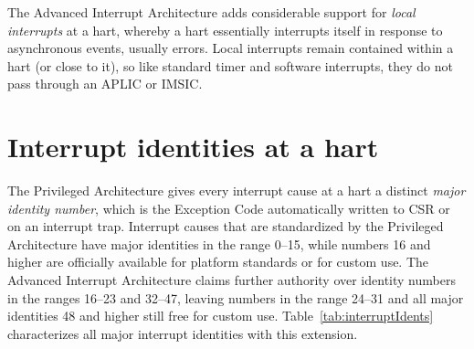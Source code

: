 The Advanced Interrupt Architecture adds considerable support
for \emph{local interrupts} at a hart, whereby a hart essentially
interrupts itself in response to asynchronous events, usually errors.
Local interrupts remain contained within a hart (or close to it),
so like standard {\RISCV} timer and software interrupts, they do not
pass through an APLIC or IMSIC.

\section{Interrupt identities at a hart}

The {\RISCV} Privileged Architecture gives every interrupt cause at a
hart a distinct \emph{major identity number}, which is the Exception
Code automatically written to CSR  or  on an
interrupt trap.
Interrupt causes that are standardized by the Privileged Architecture
have major identities in the range 0--15, while numbers 16 and higher
are officially available for platform standards or for custom use.
The Advanced Interrupt Architecture claims further authority over
identity numbers in the ranges 16--23 and 32--47, leaving numbers in the
range 24--31 and all major identities 48 and higher still free for custom
use.
Table~\ref{tab:interruptIdents} characterizes all major interrupt
identities with this extension.

